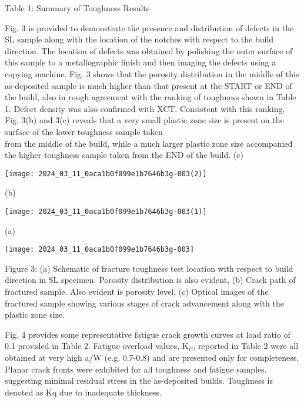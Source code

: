 \documentclass[10pt]{article}
\begin{document}
Table 1: Summary of Toughness Results

Fig. 3 is provided to demonstrate the presence and distribution of defects in the SL sample along with the location of the notches with respect to the build direction. The location of defects was obtained by polishing the outer surface of this sample to a metallographic finish and then imaging the defects using a copying machine. Fig. 3 shows that the porosity distribution in the middle of this as-deposited sample is much higher than that present at the START or END of the build, also in rough agreement with the ranking of toughness shown in Table 1. Defect density was also confirmed with XCT. Consistent with this ranking, Fig. 3(b) and 3(c) reveals that a very small plastic zone size is present on the surface of the lower toughness sample taken\\
from the middle of the build, while a much larger plastic zone size accompanied the higher toughness sample taken from the END of the build. (c)

\begin{center}
\texttt{[image: 2024\_03\_11\_0aca1b0f099e1b7646b3g-003(2)]}
\end{center}

(b)

\begin{center}
\texttt{[image: 2024\_03\_11\_0aca1b0f099e1b7646b3g-003(1)]}
\end{center}

(a)

\begin{center}
\texttt{[image: 2024\_03\_11\_0aca1b0f099e1b7646b3g-003]}
\end{center}

Figure 3: (a) Schematic of fracture toughness test location with respect to build direction in SL specimen. Porosity distribution is also evident, (b) Crack path of fractured sample. Also evident is porosity level, (c) Optical images of the fractured sample showing various stages of crack advancement along with the plastic zone size.

Fig. 4 provides some representative fatigue crack growth curves at load ratio of 0.1 provided in Table 2. Fatigue overload values, $\mathrm{K}_{\mathrm{C}}$, reported in Table 2 were all obtained at very high a/W (e.g. 0.7-0.8) and are presented only for completeness. Planar crack fronts were exhibited for all toughness and fatigue samples, suggesting minimal residual stress in the as-deposited builds. Toughness is denoted as Kq due to inadequate thickness.
\end{document}
